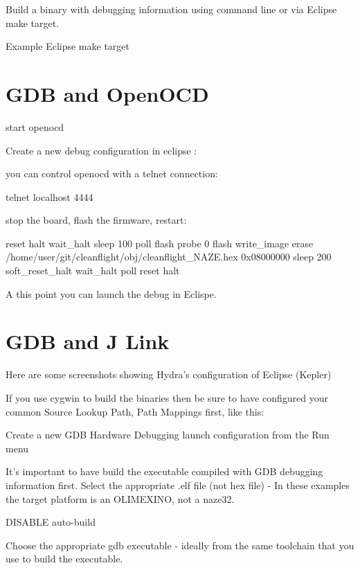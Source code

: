 Build a binary with debugging information using command line or via Eclipse make target.

Example Eclipse make target



\section*{G\+D\+B and Open\+O\+C\+D}

start openocd

Create a new debug configuration in eclipse \+:  

you can control openocd with a telnet connection\+: \begin{DoxyVerb} telnet localhost 4444
\end{DoxyVerb}


stop the board, flash the firmware, restart\+: \begin{DoxyVerb} reset halt
 wait_halt 
 sleep 100
 poll
 flash probe 0
 flash write_image erase /home/user/git/cleanflight/obj/cleanflight_NAZE.hex 0x08000000
 sleep 200
 soft_reset_halt
 wait_halt
 poll
 reset halt
\end{DoxyVerb}


A this point you can launch the debug in Eclispe. 

\section*{G\+D\+B and J Link}

Here are some screenshots showing Hydra's configuration of Eclipse (Kepler)

If you use cygwin to build the binaries then be sure to have configured your common {\ttfamily Source Lookup Path}, {\ttfamily Path Mappings} first, like this\+:



Create a new {\ttfamily G\+D\+B Hardware Debugging} launch configuration from the {\ttfamily Run} menu

It's important to have build the executable compiled with G\+D\+B debugging information first. Select the appropriate .elf file (not hex file) -\/ In these examples the target platform is an O\+L\+I\+M\+E\+X\+I\+N\+O, not a naze32.

D\+I\+S\+A\+B\+L\+E auto-\/build



Choose the appropriate gdb executable -\/ ideally from the same toolchain that you use to build the executable.



